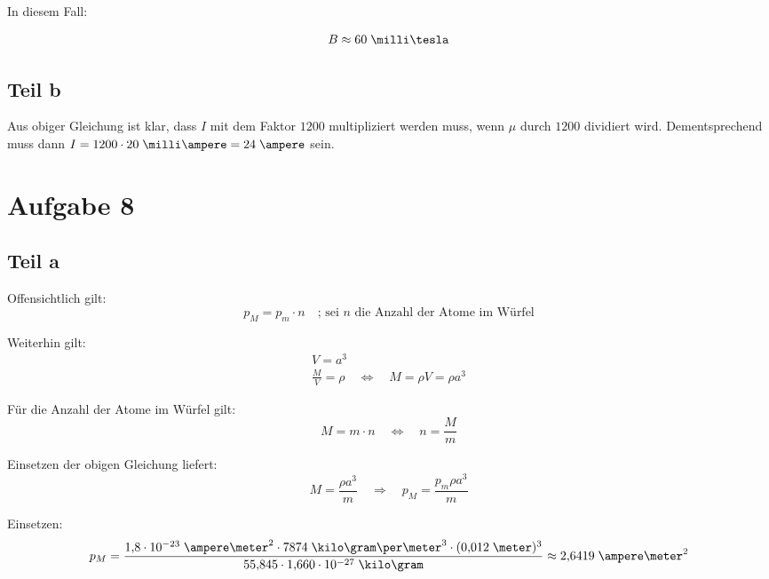 \documentclass[a4paper,german,12pt,smallheadings]{scrartcl}
\begin{document}
In diesem Fall:

\begin{align*}
  B \approx 60 \;\milli\tesla
\end{align*}

\subsection*{Teil b}
Aus obiger Gleichung ist klar, dass $I$ mit dem Faktor $1200$ multipliziert
werden muss, wenn $\mu$ durch $1200$ dividiert wird. Dementsprechend muss dann
$I = 1200 \cdot 20\;\milli\ampere = 24\;\ampere$ sein.


\section*{Aufgabe 8}
\subsection*{Teil a}

Offensichtlich gilt:
\begin{equation*}
p_M=p_m \cdot n \quad \text{; sei $n$ die Anzahl der Atome im Würfel}
\end{equation*}

Weiterhin gilt:
\begin{align*}
V=a^3\\
\frac{M}{V}=\rho \quad \Leftrightarrow \quad M=\rho V = \rho a^3
\end{align*}

Für die Anzahl der Atome im Würfel gilt:
\begin{equation*}
M=m\cdot n \quad \Leftrightarrow \quad n=\frac{M}{m}
\end{equation*}

Einsetzen der obigen Gleichung liefert:
\begin{equation*}
M=\frac{\rho a^3}{m} \quad \Rightarrow \quad p_M=\frac{p_m \rho a^3}{m}
\end{equation*}

Einsetzen:
\begin{equation*}
p_M=\frac{1{,}8 \cdot 10^{-23}\;\ampere\meter^2 \cdot 7874 \;\kilo\gram\per\meter^3 \cdot (0{,}012 \;\meter)^3}{55{,}845 \cdot 1{,}660 \cdot 10^{-27} \;\kilo\gram} \approx 2{,}6419 \;\ampere\meter^2
\end{equation*}
\end{document}
